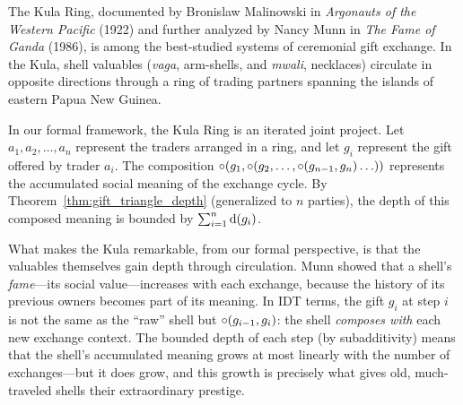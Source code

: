 \begin{example}
\label{ex:kula-ring}
The Kula Ring, documented by Bronislaw Malinowski in \textit{Argonauts
of the Western Pacific} (1922) and further analyzed by Nancy Munn in
\textit{The Fame of Ganda} (1986), is among the best-studied systems of
ceremonial gift exchange.  In the Kula, shell valuables (\textit{vaga},
arm-shells, and \textit{mwali}, necklaces) circulate in opposite
directions through a ring of trading partners spanning the islands of
eastern Papua New Guinea.

In our formal framework, the Kula Ring is an iterated joint project.
Let $a_1, a_2, \ldots, a_n$ represent the traders arranged in a ring,
and let $g_i$ represent the gift offered by trader $a_i$.  The
composition $\circ(g_1, \circ(g_2, \ldots, \circ(g_{n-1},
g_n)\ldots))$ represents the accumulated social meaning of the exchange
cycle.  By Theorem~\ref{thm:gift_triangle_depth} (generalized to $n$
parties), the depth of this composed meaning is bounded by
$\sum_{i=1}^n \operatorname{d}(g_i)$.

What makes the Kula remarkable, from our formal perspective, is that
the valuables themselves gain depth through circulation.  Munn showed
that a shell's \emph{fame}---its social value---increases with each
exchange, because the history of its previous owners becomes part of
its meaning.  In IDT terms, the gift $g_i$ at step $i$ is not the
same as the ``raw'' shell but $\circ(g_{i-1}, g_i)$: the shell
\emph{composes with} each new exchange context.  The bounded depth of
each step (by subadditivity) means that the shell's accumulated meaning
grows at most linearly with the number of exchanges---but it does grow,
and this growth is precisely what gives old, much-traveled shells their
extraordinary prestige.
\end{example}

